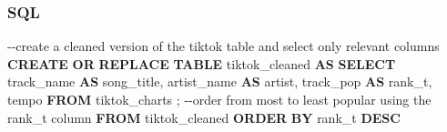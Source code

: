 \documentclass[
  letterpaper,
  DIV=11,
  numbers=noendperiod]{scrreprt}
\newenvironment{Shaded}{\begin{snugshade}}{\end{snugshade}}
\newcommand{\CommentTok}[1]{\textcolor[rgb]{0.37,0.37,0.37}{#1}}
\newcommand{\KeywordTok}[1]{\textcolor[rgb]{0.00,0.23,0.31}{\textbf{#1}}}
\newcommand{\NormalTok}[1]{\textcolor[rgb]{0.00,0.23,0.31}{#1}}
\begin{document}
\subsubsection{SQL}

\begin{Shaded}
\begin{Highlighting}[]
\CommentTok{{-}{-}create a cleaned version of the tiktok table and select only relevant columns}
\KeywordTok{CREATE} \KeywordTok{OR} \KeywordTok{REPLACE} \KeywordTok{TABLE}\NormalTok{ tiktok\_cleaned }\KeywordTok{AS}
  \KeywordTok{SELECT}\NormalTok{ track\_name }\KeywordTok{AS}\NormalTok{ song\_title, artist\_name }\KeywordTok{AS}\NormalTok{ artist, track\_pop }\KeywordTok{AS}\NormalTok{ rank\_t, tempo}
  \KeywordTok{FROM}\NormalTok{ tiktok\_charts}
\NormalTok{;}
\CommentTok{{-}{-}order from most to least popular using the rank\_t column}
\KeywordTok{FROM}\NormalTok{ tiktok\_cleaned}
\KeywordTok{ORDER} \KeywordTok{BY}\NormalTok{ rank\_t }\KeywordTok{DESC}
\end{Highlighting}
\end{Shaded}
\end{document}

